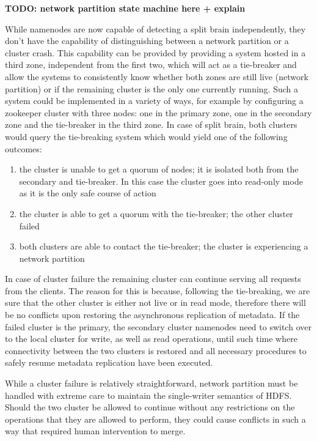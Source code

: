 \textbf{TODO: network partition state machine here + explain}


While namenodes are now capable of detecting a split brain independently, they don't have the capability of distinguishing between a network partition or a cluster crash.
This capability can be provided by providing a system hosted in a third zone, independent from the first two, which will act as a tie-breaker and allow the systems to consistently know whether both zones are still live (network partition) or if the remaining cluster is the only one currently running.
Such a system could be implemented in a variety of ways, for example by configuring a zookeeper cluster \cite{zookeeper} with three nodes: one in the primary zone, one in the secondary zone and the tie-breaker in the third zone.
In case of split brain, both clusters would query the tie-breaking system which would yield one of the following outcomes:
\begin{enumerate}
    \item the cluster is unable to get a quorum of nodes; it is isolated both from the secondary and tie-breaker. In this case the cluster goes into read-only mode as it is the only safe course of action
    \item the cluster is able to get a quorum with the tie-breaker; the other cluster failed
    \item both clusters are able to contact the tie-breaker; the cluster is experiencing a network partition
\end{enumerate}

In case of cluster failure the remaining cluster can continue serving all requests from the clients.
The reason for this is because, following the tie-breaking, we are sure that the other cluster is either not live or in read mode, therefore there will be no conflicts upon restoring the asynchronous replication of metadata.
If the failed cluster is the primary, the secondary cluster namenodes need to switch over to the local cluster for write, as well as read operations, until such time where connectivity between the two clusters is restored and all necessary procedures to safely resume metadata replication have been executed.

While a cluster failure is relatively straightforward, network partition must be handled with extreme care to maintain the single-writer semantics of HDFS.
Should the two cluster be allowed to continue without any restrictions on the operations that they are allowed to perform, they could cause conflicts in such a way that required human intervention to merge.

